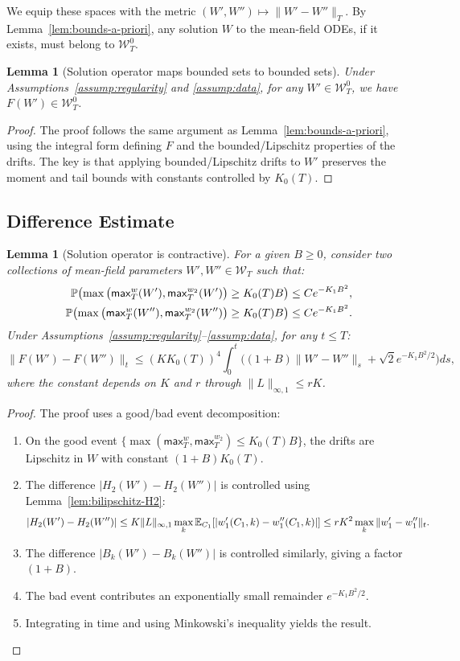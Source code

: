 \documentclass[nohyperref]{article}
\theoremstyle{plain}
\newtheorem{lemma}[theorem]{Lemma}
\theoremstyle{definition}
\theoremstyle{remark}
\begin{document}
We equip these spaces with the metric $(W',W'')\mapsto \|W'-W''\|_T$. By Lemma~\ref{lem:bounds-a-priori}, any solution $W$ to the mean-field ODEs, if it exists, must belong to $\mathcal{W}_T^0$.

\begin{lemma}[Solution operator maps bounded sets to bounded sets]
\label{lem:invariance-F}
Under Assumptions~\ref{assump:regularity} and \ref{assump:data}, for any $W'\in\mathcal{W}_T^0$, we have $F(W')\in\mathcal{W}_T^0$.
\end{lemma}

\begin{proof}
The proof follows the same argument as Lemma~\ref{lem:bounds-a-priori}, using the integral form defining $F$ and the bounded/Lipschitz properties of the drifts. The key is that applying bounded/Lipschitz drifts to $W'$ preserves the moment and tail bounds with constants controlled by $K_0(T)$.
\end{proof}

\subsection{Difference Estimate}

\begin{lemma}[Solution operator is contractive]
\label{lem:difference-F}
For a given $B\ge 0$, consider two collections of mean-field parameters $W',W''\in\mathcal{W}_T$ such that:
\begin{align*}
\mathbb{P}\!\left(\max\big(\mathsf{max}_T^w(W'), \mathsf{max}_T^{w_2}(W')\big)\ge K_0(T)B\right) &\le C e^{-K_1 B^2},\\
\mathbb{P}\!\left(\max\big(\mathsf{max}_T^w(W''), \mathsf{max}_T^{w_2}(W'')\big)\ge K_0(T)B\right) &\le C e^{-K_1 B^2}.
\end{align*}
Under Assumptions~\ref{assump:regularity}--\ref{assump:data}, for any $t\le T$:
\[
\|F(W')-F(W'')\|_t \le (KK_0(T))^4 \int_0^t \Big((1+B)\|W'-W''\|_s + \sqrt{2}e^{-K_1 B^2/2}\Big)ds,
\]
where the constant depends on $K$ and $r$ through $\|L\|_{\infty,1}\le rK$.
\end{lemma}

\begin{proof}
The proof uses a good/bad event decomposition:
\begin{enumerate}
\item On the good event $\{\max(\mathsf{max}_T^w, \mathsf{max}_T^{w_2})\le K_0(T)B\}$, the drifts are Lipschitz in $W$ with constant $(1+B)K_0(T)$.
\item The difference $|H_2(W')-H_2(W'')|$ is controlled using Lemma~\ref{lem:bilipschitz-H2}:
\[
|H_2(W')-H_2(W'')| \le K\|L\|_{\infty,1}\max_k\mathbb{E}_{C_1}[|w_1'(C_1,k)-w_1''(C_1,k)|] \le rK^2\max_k\|w_1'-w_1''\|_t.
\]
\item The difference $|B_k(W')-B_k(W'')|$ is controlled similarly, giving a factor $(1+B)$.
\item The bad event contributes an exponentially small remainder $e^{-K_1 B^2/2}$.
\item Integrating in time and using Minkowski's inequality yields the result.
\end{enumerate}
\end{proof}
\end{document}
